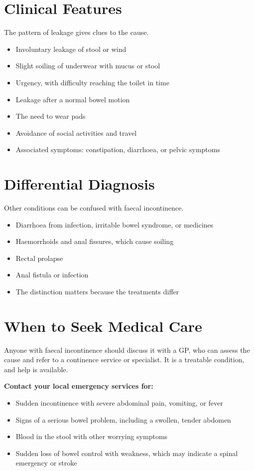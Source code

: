 \section*{Clinical Features}
The pattern of leakage gives clues to the cause.
\begin{itemize}
    \item Involuntary leakage of stool or wind
    \item Slight soiling of underwear with mucus or stool
    \item Urgency, with difficulty reaching the toilet in time
    \item Leakage after a normal bowel motion
    \item The need to wear pads
    \item Avoidance of social activities and travel
    \item Associated symptoms: constipation, diarrhoea, or pelvic symptoms
\end{itemize}

\section*{Differential Diagnosis}
Other conditions can be confused with faecal incontinence.
\begin{itemize}
    \item Diarrhoea from infection, irritable bowel syndrome, or medicines
    \item Haemorrhoids and anal fissures, which cause soiling
    \item Rectal prolapse
    \item Anal fistula or infection
    \item The distinction matters because the treatments differ
\end{itemize}

\section*{When to Seek Medical Care}
Anyone with faecal incontinence should discuss it with a GP, who can assess the cause and refer to a continence service or specialist. It is a treatable condition, and help is available.

\textbf{Contact your local emergency services for:}
\begin{itemize}
    \item Sudden incontinence with severe abdominal pain, vomiting, or fever
    \item Signs of a serious bowel problem, including a swollen, tender abdomen
    \item Blood in the stool with other worrying symptoms
    \item Sudden loss of bowel control with weakness, which may indicate a spinal emergency or stroke
\end{itemize}

